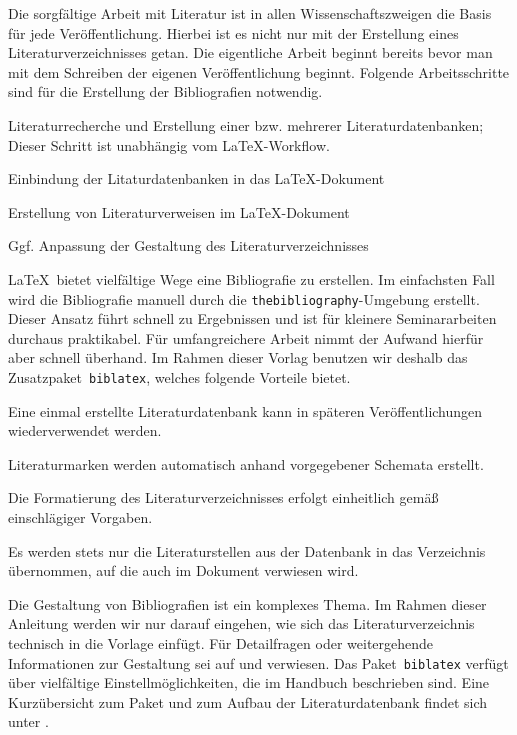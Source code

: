 Die sorgfältige Arbeit mit Literatur ist in allen Wissenschaftszweigen die
Basis für jede Veröffentlichung. Hierbei ist es nicht nur mit der Erstellung
eines Literaturverzeichnisses getan. Die eigentliche Arbeit beginnt bereits
bevor man mit dem Schreiben der eigenen Veröffentlichung beginnt. Folgende
Arbeitsschritte sind für die Erstellung der Bibliografien notwendig.
%
\begin{compactenum}
\item Literaturrecherche und Erstellung einer bzw. mehrerer
      Literaturdatenbanken; Dieser Schritt ist unabhängig vom \LaTeX-Workflow.
\item Einbindung der Litaturdatenbanken in das \LaTeX-Dokument
\item Erstellung von Literaturverweisen im \LaTeX-Dokument
\item Ggf. Anpassung der Gestaltung des Literaturverzeichnisses
\end{compactenum}

\LaTeX\ bietet vielfältige Wege eine Bibliografie zu erstellen. Im einfachsten
Fall wird die Bibliografie manuell durch die \texttt{thebibliography}-Umgebung
erstellt. Dieser Ansatz führt schnell zu Ergebnissen und ist für kleinere
Seminararbeiten durchaus praktikabel. Für umfangreichere Arbeit nimmt der
Aufwand hierfür aber schnell überhand. Im Rahmen dieser Vorlag benutzen wir
deshalb das Zusatzpaket~\texttt{biblatex}, welches folgende Vorteile bietet.
%
\begin{compactitem}
\item Eine einmal erstellte Literaturdatenbank kann in späteren
      Veröffentlichungen wiederverwendet werden.
\item Literaturmarken werden automatisch anhand vorgegebener Schemata erstellt.
\item Die Formatierung des Literaturverzeichnisses erfolgt einheitlich gemäß
      einschlägiger Vorgaben.
\item Es werden stets nur die Literaturstellen aus der Datenbank in das
      Verzeichnis übernommen, auf die auch im Dokument verwiesen wird.
\end{compactitem}

Die Gestaltung von Bibliografien ist ein komplexes Thema. Im Rahmen dieser
Anleitung werden wir nur darauf eingehen, wie sich das Literaturverzeichnis
technisch in die Vorlage einfügt. Für Detailfragen oder weitergehende
Informationen zur Gestaltung sei auf \cite{voss_bibliografien} und
\cite[Kapitel~13]{voss_wissenschaftliche_arbeit} verwiesen. Das
Paket~\texttt{biblatex} verfügt über vielfältige Einstellmöglichkeiten, die im
Handbuch \cite{pkgmanual_biblatex} beschrieben sind. Eine Kurzübersicht zum
Paket und zum Aufbau der Literaturdatenbank findet sich unter
\cite{rees_biblatex_cheat}.
